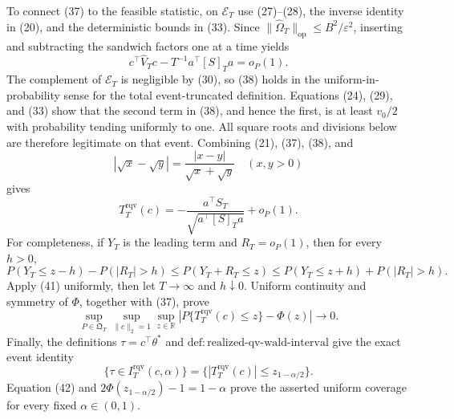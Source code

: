 To connect (37) to the feasible statistic, on \(\mathcal E_T\) use (27)--(28), the inverse identity in (20), and the deterministic bounds in (33). Since \(\|\widehat\Omega_T\|_{\mathrm{op}}\le B^2/\varepsilon^2\), inserting and subtracting the sandwich factors one at a time yields
\[
 c^\top\widehat V_Tc
 -T^{-1}a^\top[S]_Ta=o_P(1).
\tag{38}
\]
The complement of \(\mathcal E_T\) is negligible by (30), so (38) holds in the uniform-in-probability sense for the total event-truncated definition. Equations (24), (29), and (33) show that the second term in (38), and hence the first, is at least \(v_0/2\) with probability tending uniformly to one. All square roots and divisions below are therefore legitimate on that event. Combining (21), (37), (38), and
\[
 |\sqrt x-\sqrt y|=\frac{|x-y|}{\sqrt x+\sqrt y}
 \quad(x,y>0)
\tag{39}
\]
gives
\[
 T_T^{\mathrm{rqv}}(c)
 =-\frac{a^\top S_T}{\sqrt{a^\top[S]_Ta}}+o_P(1).
\tag{40}
\]
For completeness, if \(Y_T\) is the leading term and \(R_T=o_P(1)\), then for every \(h>0\),
\[
 P(Y_T\le z-h)-P(|R_T|>h)
 \le P(Y_T+R_T\le z)
 \le P(Y_T\le z+h)+P(|R_T|>h).
\tag{41}
\]
Apply (41) uniformly, then let \(T\to\infty\) and \(h\downarrow0\). Uniform continuity and symmetry of \(\Phi\), together with (37), prove
\[
 \sup_{P\in\mathfrak Q_T}\sup_{\|c\|_2=1}\sup_{z\in\mathbb R}
 \left|P\{T_T^{\mathrm{rqv}}(c)\le z\}-\Phi(z)\right|\longrightarrow0.
\tag{42}
\]
Finally, the definitions \(\tau=c^\top\theta^*\) and \(\mathrm{def:realized\text{-}qv\text{-}wald\text{-}interval}\) give the exact event identity
\[
 \{\tau\in I_T^{\mathrm{rqv}}(c,\alpha)\}
 =\{|T_T^{\mathrm{rqv}}(c)|\le z_{1-\alpha/2}\}.
\tag{43}
\]
Equation (42) and \(2\Phi(z_{1-\alpha/2})-1=1-\alpha\) prove the asserted uniform coverage for every fixed \(\alpha\in(0,1)\).

